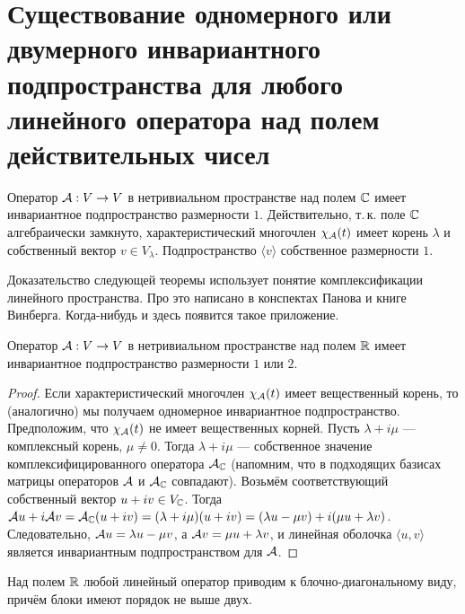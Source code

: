 \section{Существование одномерного или двумерного инвариантного подпространства для любого линейного оператора над полем действительных чисел}

Оператор $\mathcal{A}: V \to V$ в нетривиальном пространстве над полем $\mathbb{C}$ имеет инвариантное подпространство размерности $1$. Действительно, т.\,к. поле $\mathbb{C}$ алгебраически замкнуто, характеристический многочлен $\chi_{\mathcal{A}}(t)$ имеет корень $\lambda$ и собственный вектор $v \in V_\lambda$. Подпространство $\langle v\rangle$ собственное размерности $1$.

Доказательство следующей теоремы использует понятие комплексификации линейного пространства. Про это написано в конспектах Панова и книге Винберга. Когда-нибудь и здесь появится такое приложение.

\begin{theorem}
    Оператор $\mathcal{A}: V \to V$ в нетривиальном пространстве над полем $\mathbb{R}$ имеет инвариантное подпространство размерности $1$ или $2$.
\end{theorem}

\begin{proof}
    Если характеристический многочлен $\chi_{\mathcal{A}}(t)$ имеет вещественный корень, то (аналогично) мы получаем одномерное инвариантное подпространство. Предположим, что $\chi_{\mathcal{A}}(t)$ не имеет вещественных корней. Пусть $\lambda + i\mu$ --- комплексный корень, $\mu \ne 0$. Тогда $\lambda + i\mu$ --- собственное значение комплексифицированного оператора $\mathcal{A}_{\mathbb{C}}$ (напомним, что в подходящих базисах матрицы операторов $\mathcal{A}$ и $\mathcal{A}_{\mathbb{C}}$ совпадают). Возьмём соответствующий собственный вектор $u + iv \in V_{\mathbb{C}}$. Тогда $\mathcal{A} u + i\mathcal{A} v = \mathcal{A}_{\mathbb{C}}(u + iv) = (\lambda + i\mu)(u + iv) = (\lambda u - \mu v) + i(\mu u + \lambda v)$. Следовательно, $\mathcal{A} u = \lambda u - \mu v$, а $\mathcal{A} v = \mu u + \lambda v$, и линейная оболочка $\langle u, v\rangle$ является инвариантным подпространством для $\mathcal{A}$.
\end{proof}

\begin{corollary}
    Над полем $\mathbb{R}$ любой линейный оператор приводим к блочно-диагональному виду, причём блоки имеют порядок не выше двух.
\end{corollary}

